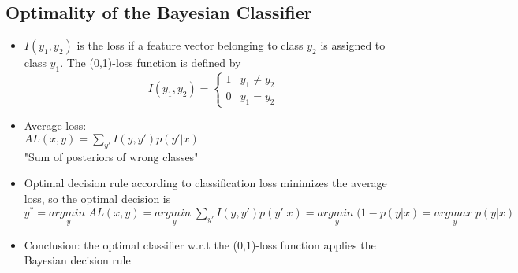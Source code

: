 \subsection*{Optimality of the Bayesian Classifier}
\begin{itemize}
    \item
        $I(y_1, y_2)$ is the loss if a feature vector belonging to class $y_2$ is assigned to class $y_1$. The (0,1)-loss function is defined by
        \begin{equation*}
        I(y_1, y_2) = 
            \begin{cases}
                1 & y_1 \neq y_2\\
                0 & y_1 = y_2
            \end{cases}
        \end{equation*}
    \item
        Average loss:\\
        $AL(x, y) = \sum_{y'}I(y, y')p(y'|x)$\\
        "Sum of posteriors of wrong classes"
    \item
        Optimal decision rule according to classification loss minimizes the average loss, so the optimal decision is
        $y^* = \underset{y}{argmin \;} AL(x,y) = \underset{y}{argmin \;} \sum_{y'}I(y, y')p(y'|x) = \underset{y}{argmin \;}(1-p(y|x) = \underset{y}{argmax \;}p(y|x)$
    \item
        Conclusion: the optimal classifier w.r.t the (0,1)-loss function applies the Bayesian decision rule
\end{itemize}
